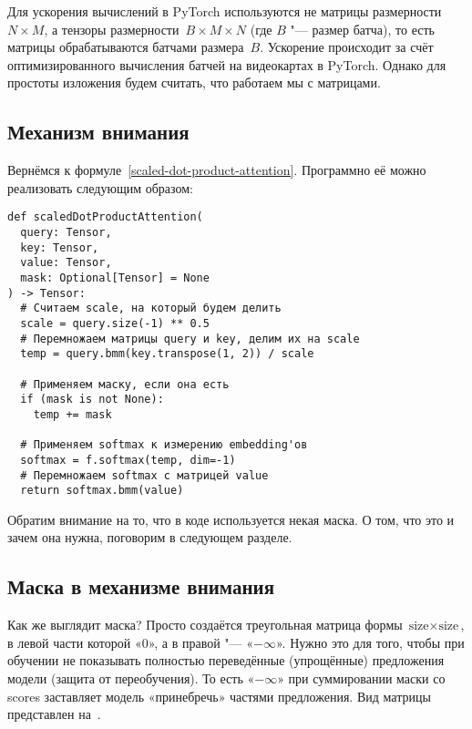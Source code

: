 Для ускорения вычислений в PyTorch используются не матрицы размерности~$N \times M$, а тензоры размерности~$B \times M \times N$ (где $B$ "--- размер батча), то есть матрицы обрабатываются батчами размера~$B$. Ускорение происходит за счёт оптимизированного вычисления батчей на видеокартах в PyTorch. Однако для простоты изложения будем считать, что работаем мы с матрицами.


\subsection{Механизм внимания}


Вернёмся к формуле~\eqref{scaled-dot-product-attention}. Программно её можно реализовать следующим образом:

\begin{verbatim}
def scaledDotProductAttention(
  query: Tensor,
  key: Tensor,
  value: Tensor,
  mask: Optional[Tensor] = None
) -> Tensor:
  # Считаем scale, на который будем делить
  scale = query.size(-1) ** 0.5
  # Перемножаем матрицы query и key, делим их на scale
  temp = query.bmm(key.transpose(1, 2)) / scale

  # Применяем маску, если она есть
  if (mask is not None):
    temp += mask

  # Применяем softmax к измерению embedding'ов
  softmax = f.softmax(temp, dim=-1)
  # Перемножаем softmax с матрицей value
  return softmax.bmm(value)
\end{verbatim}

Обратим внимание на то, что в коде используется некая маска. О том, что это и зачем она нужна, поговорим в следующем разделе.


\subsection{Маска в механизме внимания}


Как же выглядит маска? Просто создаётся треугольная матрица формы $ \text{size} \times \text{size} $, в левой части которой «$0$», а в правой "--- «$-\infty$». Нужно это для того, чтобы при обучении не показывать полностью переведённые (упрощённые) предложения модели (защита от переобучения). То есть «$-\infty$» при суммировании маски со scores заставляет модель «принебречь» частями предложения. Вид матрицы представлен на~.

